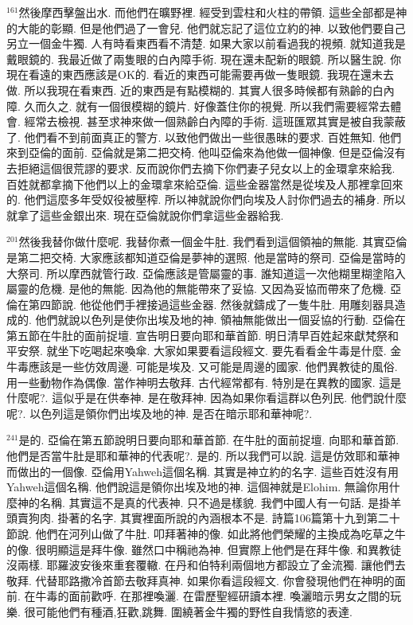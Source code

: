\documentclass{book}
\begin{document}
$^{161}$然後摩西擊盤出水.
而他們在曠野裡.
經受到雲柱和火柱的帶領.
這些全部都是神的大能的彰顯.
但是他們過了一會兒.
他們就忘記了這位立約的神.
以致他們要自己另立一個金牛獨.
人有時看東西看不清楚.
如果大家以前看過我的視頻.
就知道我是戴眼鏡的.
我最近做了兩隻眼的白內障手術.
現在還未配新的眼鏡.
所以醫生說.
你現在看遠的東西應該是OK的.
看近的東西可能需要再做一隻眼鏡.
我現在還未去做.
所以我現在看東西.
近的東西是有點模糊的.
其實人很多時候都有熟齡的白內障.
久而久之.
就有一個很模糊的鏡片.
好像蓋住你的視覺.
所以我們需要經常去體會.
經常去檢視.
甚至求神來做一個熟齡白內障的手術.
這班匯眾其實是被自我蒙蔽了.
他們看不到前面真正的警方.
以致他們做出一些很愚昧的要求.
百姓無知.
他們來到亞倫的面前.
亞倫就是第二把交椅.
他叫亞倫來為他做一個神像.
但是亞倫沒有去拒絕這個很荒謬的要求.
反而說你們去摘下你們妻子兒女以上的金環拿來給我.
百姓就都拿摘下他們以上的金環拿來給亞倫.
這些金器當然是從埃及人那裡拿回來的.
他們這麼多年受奴役被壓榨.
所以神就說你們向埃及人討你們過去的補身.
所以就拿了這些金銀出來.
現在亞倫就說你們拿這些金器給我.

$^{201}$然後我替你做什麼呢.
我替你煮一個金牛肚.
我們看到這個領袖的無能.
其實亞倫是第二把交椅.
大家應該都知道亞倫是夢神的選照.
他是當時的祭司.
亞倫是當時的大祭司.
所以摩西就管行政.
亞倫應該是管屬靈的事.
誰知道這一次他糊里糊塗陷入屬靈的危機.
是他的無能.
因為他的無能帶來了妥協.
又因為妥協而帶來了危機.
亞倫在第四節說.
他從他們手裡接過這些金器.
然後就鑄成了一隻牛肚.
用雕刻器具造成的.
他們就說以色列是使你出埃及地的神.
領袖無能做出一個妥協的行動.
亞倫在第五節在牛肚的面前捉壇.
宣告明日要向耶和華首節.
明日清早百姓起來獻梵祭和平安祭.
就坐下吃喝起來喚傘.
大家如果要看這段經文.
要先看看金牛毒是什麼.
金牛毒應該是一些仿效周邊.
可能是埃及.
又可能是周邊的國家.
他們異教徒的風俗.
用一些動物作為偶像.
當作神明去敬拜.
古代經常都有.
特別是在異教的國家.
這是什麼呢?.
這似乎是在供奉神.
是在敬拜神.
因為如果你看這群以色列民.
他們說什麼呢?.
以色列這是領你們出埃及地的神.
是否在暗示耶和華神呢?.

$^{241}$是的.
亞倫在第五節說明日要向耶和華首節.
在牛肚的面前捉壇.
向耶和華首節.
他們是否當牛肚是耶和華神的代表呢?.
是的.
所以我們可以說.
這是仿效耶和華神而做出的一個像.
亞倫用Yahweh這個名稱.
其實是神立約的名字.
這些百姓沒有用Yahweh這個名稱.
他們說這是領你出埃及地的神.
這個神就是Elohim.
無論你用什麼神的名稱.
其實這不是真的代表神.
只不過是樣貌.
我們中國人有一句話.
是掛羊頭賣狗肉.
掛著的名字.
其實裡面所說的內涵根本不是.
詩篇106篇第十九到第二十節說.
他們在河列山做了牛肚.
叩拜著神的像.
如此將他們榮耀的主換成為吃草之牛的像.
很明顯這是拜牛像.
雖然口中稱祂為神.
但實際上他們是在拜牛像.
和異教徒沒兩樣.
耶羅波安後來重套覆轍.
在丹和伯特利兩個地方都設立了金流獨.
讓他們去敬拜.
代替耶路撒冷首節去敬拜真神.
如果你看這段經文.
你會發現他們在神明的面前.
在牛毒的面前歡呼.
在那裡喚灑.
在雷歷聖經研讀本裡.
喚灑暗示男女之間的玩樂.
很可能他們有種酒,狂歡,跳舞.
圍繞著金牛獨的野性自我情慾的表達.
\end{document}

